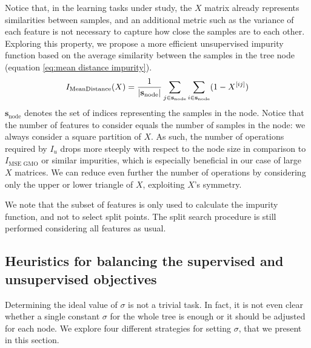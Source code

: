 Notice that, in the learning tasks under study, the $X$ matrix already represents similarities between samples, and an additional metric such as the variance of each feature is not necessary to capture how close the samples are to each other. 
%
Exploring this property, we propose a more efficient unsupervised impurity function based on the average similarity between the samples in the tree node (equation \ref{eq:mean distance impurity}).
%
\begin{equation}
    I_\text{MeanDistance}(X) = \frac{1}{|\mathbf{s}_\text{node}|}
        \sum_{j \in \mathbf{s}_\text{node}}
        \sum_{i \in \mathbf{s}_\text{node}} (1 - X^{[ij]})
    \label{eq:mean distance impurity}
\end{equation}
%
$\mathbf{s}_\text{node}$ denotes the set of indices representing the samples in the node.
Notice that the number of features to consider equals the number of samples in the node: we always consider a square partition of $X$.
As such, the number of operations required by $I_u$ drops more steeply with respect to the node size in comparison to $I_\text{MSE GMO}$ or similar impurities, 
which is especially beneficial in our case of large $X$ matrices. We can reduce even further the number of operations by considering only the upper or lower triangle of $X$, exploiting $X$'s symmetry.

We note that the subset of features is only used to calculate the impurity function, and not to select split points. The split search procedure is still performed considering all features as usual.



\subsection{Heuristics for balancing the supervised and unsupervised objectives}
\label{sec:sigma heuristics}

Determining the ideal value of $\sigma$ is not a trivial task. In fact, it is not even clear whether a single constant $\sigma$ for the whole tree is enough or it should be adjusted for each node. We explore four different strategies for setting $\sigma$, that we present in this section.

